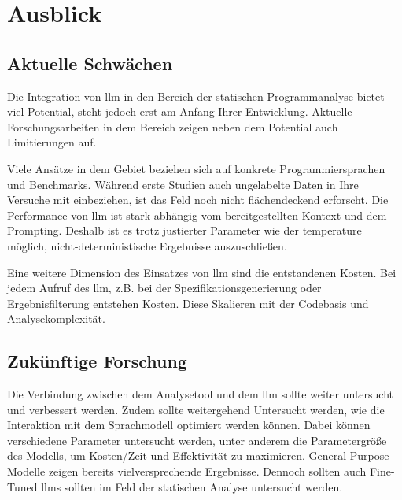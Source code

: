 \section{Ausblick}

\subsection{Aktuelle Schwächen}

Die Integration von \ac{llm} in den Bereich der statischen Programmanalyse bietet viel Potential, steht jedoch erst am Anfang Ihrer Entwicklung. Aktuelle Forschungsarbeiten in dem Bereich zeigen neben dem Potential auch Limitierungen auf.

Viele Ansätze in dem Gebiet beziehen sich auf konkrete Programmiersprachen und Benchmarks. Während erste Studien auch ungelabelte Daten in Ihre Versuche mit einbeziehen\cite{wagnerEffectiveComplementarySecurity2025}, ist das Feld noch nicht flächendeckend erforscht.  Die Performance von \ac{llm} ist stark abhängig vom bereitgestellten Kontext und dem Prompting\cite{wagnerEffectiveComplementarySecurity2025}.  Deshalb ist es trotz justierter Parameter wie der temperature möglich,  nicht-deterministische Ergebnisse auszuschließen\cite{khareUnderstandingEffectivenessLarge2024}.

Eine weitere Dimension des Einsatzes von \ac{llm} sind die entstandenen Kosten. Bei jedem Aufruf des \ac{llm}, z.B. bei der Spezifikationsgenerierung oder Ergebnisfilterung entstehen Kosten. Diese Skalieren mit der Codebasis und Analysekomplexität\cite{liEnhancingStaticAnalysis2024}. 

\subsection{Zukünftige Forschung}
Die Verbindung zwischen dem Analysetool und dem \ac{llm} sollte weiter untersucht und verbessert werden\cite{khareUnderstandingEffectivenessLarge2024}. Zudem sollte weitergehend Untersucht werden, wie die Interaktion mit dem Sprachmodell optimiert werden können. Dabei können verschiedene Parameter untersucht werden, unter anderem die Parametergröße des Modells, um Kosten/Zeit und Effektivität zu maximieren. General Purpose Modelle zeigen bereits vielversprechende Ergebnisse. Dennoch sollten auch Fine-Tuned \acp{llm} sollten im Feld der statischen Analyse untersucht werden\cite{wagnerEffectiveComplementarySecurity2025}.
